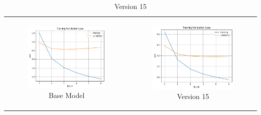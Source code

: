 \begin{table}[ht]
  \centering
  \begin{tabular}{cc}
    \begin{subfigure}{0.45\textwidth}
      \includegraphics[width=\linewidth]{img/curve_base.png}
      \caption{Base Model}
    \end{subfigure} & 
    \begin{subfigure}{0.45\textwidth}
      \includegraphics[width=\linewidth]{img/curve_15.png}
      \caption{Version 15}
    \end{subfigure} \\

\end{tabular}
\end{table}
